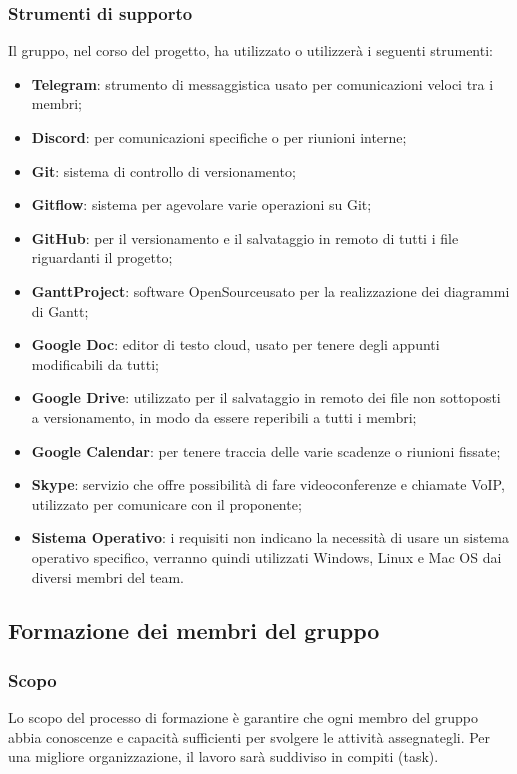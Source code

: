 \subsubsection{Strumenti di supporto}
Il gruppo, nel corso del progetto, ha utilizzato o utilizzerà i seguenti strumenti:
\begin{itemize}
	\item \textbf{Telegram}: strumento di messaggistica usato per comunicazioni veloci tra i membri; 
	\item \textbf{Discord}: per comunicazioni specifiche o per riunioni interne;
	\item \textbf{Git}: sistema di controllo di versionamento;
	\item \textbf{Gitflow}: sistema per agevolare varie operazioni su Git;
	\item \textbf{GitHub}: per il versionamento e il salvataggio in remoto di tutti i file riguardanti il progetto;
	\item \textbf{GanttProject}: software OpenSource\glo usato per la realizzazione dei diagrammi di Gantt;
	\item \textbf{Google Doc}: editor di testo cloud, usato per tenere degli appunti modificabili da tutti;
	\item \textbf{Google Drive}: utilizzato per il salvataggio in remoto dei file non sottoposti a versionamento, in modo da essere reperibili a tutti i membri;
	\item \textbf{Google Calendar}: per tenere traccia delle varie scadenze o riunioni fissate;
	\item \textbf{Skype}: servizio che offre possibilità di fare videoconferenze e chiamate VoIP, utilizzato per comunicare con il proponente;
	\item \textbf{Sistema Operativo}: i requisiti non indicano la necessità di usare un sistema operativo specifico, verranno quindi utilizzati Windows, Linux e Mac OS dai diversi membri del team.
\end{itemize}

\subsection{Formazione dei membri del gruppo}
\subsubsection{Scopo}
Lo scopo del processo di formazione è garantire che ogni membro del gruppo abbia conoscenze e capacità sufficienti per svolgere le attività assegnategli. Per una migliore organizzazione, il lavoro sarà suddiviso in compiti (task). 

